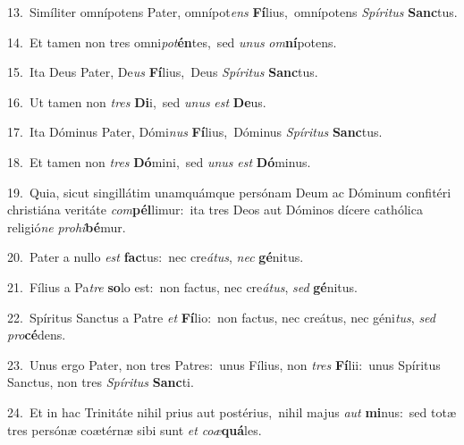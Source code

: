 {\numbfont\textcolor{\numbcolor}{13.}}~Simíliter omnípotens Pater, omnípot\textit{ens} \textbf{Fí}\-lius,~\star omnípotens \textit{Spí}\-\textit{ri}\textit{tus} \textbf{Sanc}\-tus.\par
{\numbfont\textcolor{\numbcolor}{14.}}~Et tamen non tres omni\-\textit{pot}\-\textbf{én}tes,~\star sed \textit{u}\-\textit{nus} \textit{om}\-\textbf{ní}potens.\par
{\numbfont\textcolor{\numbcolor}{15.}}~Ita Deus Pater, De\textit{us} \textbf{Fí}\-lius,~\star Deus \textit{Spí}\-\textit{ri}\textit{tus} \textbf{Sanc}\-tus.\par
{\numbfont\textcolor{\numbcolor}{16.}}~Ut tamen non \textit{tres} \textbf{Di}\-i,~\star sed \textit{u}\-\textit{nus} \textit{est} \textbf{De}\-us.\par
{\numbfont\textcolor{\numbcolor}{17.}}~Ita Dóminus Pater, Dómi\textit{nus} \textbf{Fí}\-lius,~\star Dóminus \textit{Spí}\-\textit{ri}\textit{tus} \textbf{Sanc}\-tus.\par
{\numbfont\textcolor{\numbcolor}{18.}}~Et tamen non \textit{tres} \textbf{Dó}\-mini,~\star sed \textit{u}\-\textit{nus} \textit{est} \textbf{Dó}\-minus.\par
{\numbfont\textcolor{\numbcolor}{19.}}~Quia, sicut singillátim unamquámque persónam Deum ac Dóminum confitéri christiána veritáte \textit{com}\-\textbf{pél}limur:~\star ita tres Deos aut Dóminos dícere cathólica religió\textit{ne} \textit{pro}\-\textit{hi}\textbf{bé}mur.\par
{\numbfont\textcolor{\numbcolor}{20.}}~Pater a nullo \textit{est} \textbf{fac}\-tus:~\star nec cre\-\textit{á}\-\textit{tus}, \textit{nec} \textbf{gé}\-nitus.\par
{\numbfont\textcolor{\numbcolor}{21.}}~Fílius a Pa\textit{tre} \textbf{so}\-lo est:~\star non factus, nec cre\-\textit{á}\-\textit{tus}, \textit{sed} \textbf{gé}\-nitus.\par
{\numbfont\textcolor{\numbcolor}{22.}}~Spíritus Sanctus a Patre \textit{et} \textbf{Fí}\-lio:~\star non factus, nec creátus, nec géni\-\textit{tus}\-, \textit{sed} \textit{pro}\-\textbf{cé}dens.\par
{\numbfont\textcolor{\numbcolor}{23.}}~Unus ergo Pater, non tres Patres:~\dagger unus Fílius, non \textit{tres} \textbf{Fí}\-lii:~\star unus Spíritus Sanctus, non tres \textit{Spí}\-\textit{ri}\textit{tus} \textbf{Sanc}\-ti.\par
{\numbfont\textcolor{\numbcolor}{24.}}~Et in hac Trinitáte nihil prius aut postérius,~\dagger nihil majus \textit{aut} \textbf{mi}\-nus:~\star sed totæ tres persónæ coætérnæ sibi sunt \textit{et} \textit{co}\-\textit{æ}\textbf{quá}les.\par
